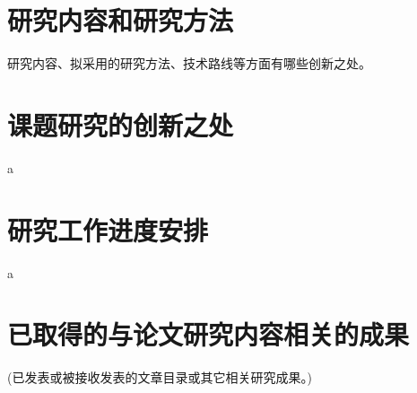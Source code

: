 \documentclass[a4paper,10pt]{article}
\begin{document}
\section{研究内容和研究方法} 

研究内容、拟采用的研究方法、技术路线等方面有哪些创新之处。

\section{课题研究的创新之处}

a

\section{研究工作进度安排}

a

\section{已取得的与论文研究内容相关的成果} 

(已发表或被接收发表的文章目录或其它相关研究成果。)



\end{document}
